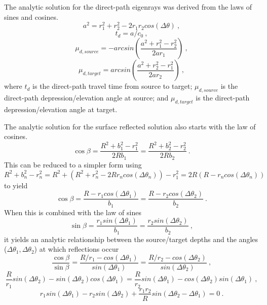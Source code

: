 \documentclass{ws-jca}
\begin{document}
The analytic solution for the direct-path eigenrays was derived from the
laws of sines and cosines.
\begin{equation}
	a^2 = r_1^2 + r_2^2 - 2 r_1 r_2 cos( \Delta \theta ) \:,
	\label{eq:eigenray_lloyds_a}
\end{equation}
\begin{equation}
	t_d = a / c_0 \:,
	\label{eq:eigenray_lloyds_tdirect}
\end{equation}
\begin{equation}
	\mu_{d,source} = - arcsin \left( \frac{a^2+r_1^2-r_2^2}{2 a r_1} \right) \:,
	\label{eq:eigenray_lloyds_mus}
\end{equation}
\begin{equation}
	\mu_{d,target} = arcsin \left( \frac{a^2+r_2^2-r_1^2}{2 a r_2} \right) \:,
	\label{eq:eigenray_lloyds_mut}
\end{equation}
where 
\( t_d \) is the direct-path travel time from source to target;
\( \mu_{d,source} \) is the direct-path depression/elevation angle at source; and
\( \mu_{d,target} \) is the direct-path depression/elevation angle at target.

The analytic solution for the surface reflected solution also starts with
the law of cosines.
\begin{equation}
	\cos{\beta} = \frac{R^2 + b_1^2 - r_1^2}{2 R b_1} 
		= \frac{R^2 + b_2^2 - r_2^2}{2 R b_2} \:.
	\label{eq:surf_1}
\end{equation}
This can be reduced to a simpler form using
\begin{equation}
	R^2 + b_n^2 - r_n^2 
		= R^2 + (R^2 + r_n^2 - 2 R r_n cos(\Delta \theta_n) ) - r_1^2 
		=  2 R ( R - r_n cos(\Delta \theta_n) )
	\label{eq:surf_2}
\end{equation}
to yield
\begin{equation}
	\cos{\beta} = \frac{R - r_1 cos(\Delta \theta_1)}{b_1} 
		= \frac{R - r_2 cos(\Delta \theta_2)}{b_2} \:.
	\label{eq:surf_3}
\end{equation}
When this is combined with the law of sines
\begin{equation}
	\sin{\beta} = \frac{r_1 sin(\Delta \theta_1)}{b_1} 
		= \frac{r_2 sin(\Delta \theta_2)}{b_2}\:,
	\label{eq:surf_4}
\end{equation}
it yields an analytic relationship between the source/target depths and the
angles (\(\Delta \theta_1, \Delta \theta_2\)) at which reflections occur
\begin{equation}
	\frac{\cos{\beta}}{\sin{\beta}} 
		= \frac{ R/r_1 - cos(\Delta \theta_1)}{sin(\Delta \theta_1)} 
		= \frac{ R/r_2 - cos(\Delta \theta_2)}{sin(\Delta \theta_2)} \:,
	\label{eq:surf_5}
\end{equation}
\begin{equation}
	\frac{R}{r_1} sin(\Delta \theta_2) - sin(\Delta \theta_2) cos(\Delta \theta_1)
	 = \frac{R}{r_2} sin(\Delta \theta_1) - cos(\Delta \theta_2) sin(\Delta \theta_1) \:,
	\label{eq:surf_6}
\end{equation}
\begin{equation}
	r_1 sin( \Delta \theta_1 ) - r_2 sin( \Delta \theta_2 ) 
		+ \frac{r_1 r_2}{R} sin( \Delta \theta_2 - \Delta \theta_1 ) = 0  \:.
	\label{eq:surf_7}
\end{equation}
\end{document}
